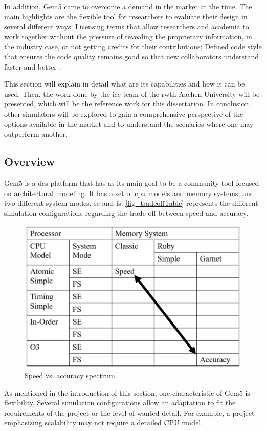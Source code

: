 In addition, Gem5 came to overcome a demand in the market at the time. The main highlights are the flexible tool for researchers to 
evaluate their design in several different ways; Licensing terms that allow researchers and academia to work together without the pressure 
of revealing the proprietary information, in the industry case, or not getting credits for their contributions; Defined code style that ensures 
the code quality remains good so that new collaborators understand faster and better \cite{TheGem5Simulator}. 

This section will explain in detail what are its capabilities and how it can be used. Then, the work done by the \gls{ice} team of the \gls{rwth} 
Aachen University will be presented, which will be the reference work for this dissertation. In conclusion, other simulators will be explored 
to gain a comprehensive perspective of the options available in the market and to understand the scenarios where one may outperform another. 

\subsection{Overview}

Gem5 is a \gls{des} platform that has as its main goal to be a community tool focused on architectural modeling. It has a set of \gls{cpu} 
models and memory systems, and two different system modes, \gls{se} and \gls{fs}. \autoref{fig_tradeoffTable} represents the different 
simulation configurations regarding the trade-off between speed and accuracy. 

\begin{figure}[H]
	\centering
 	\includegraphics[width=0.6\linewidth]{Images/tradeoffTable.png}
 	\caption{Speed vs. accuracy spectrum \cite{TheGem5Simulator}}
	 \label{fig_tradeoffTable}
\end{figure}

As mentioned in the introduction of this section, one characteristic of Gem5 is flexibility. Several simulation configurations allow an 
adaptation to fit the requirements of the project or the level of wanted detail. For example, a project emphasizing scalability may not 
require a detailed CPU model.


